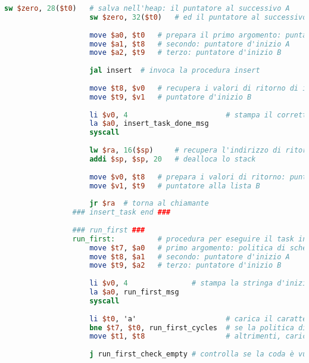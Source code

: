\begin{center}
\begin{lstlisting}[language=mips, gobble=14, stepnumber=1]
                    sw $zero, 28($t0)	# salva nell'heap: il puntatore al successivo A
                    sw $zero, 32($t0)	# ed il puntatore al successivo B
                    
                    move $a0, $t0	# prepara il primo argomento: puntatore al task appena creato (da inserire)
                    move $a1, $t8	# secondo: puntatore d'inizio A
                    move $a2, $t9	# terzo: puntatore d'inizio B
                    
                    jal insert	# invoca la procedura insert
                    
                    move $t8, $v0	# recupera i valori di ritorno di insert: puntatore d'inizio A
                    move $t9, $v1	# puntatore d'inizio B
                
                    li $v0, 4						# stampa il corretto inserimento del task
                    la $a0, insert_task_done_msg
                    syscall
                    
                    lw $ra, 16($sp)		# recupera l'indirizzo di ritorno al chiamante
                    addi $sp, $sp, 20	# dealloca lo stack
                    
                    move $v0, $t8	# prepara i valori di ritorno: puntatore alla lista A
                    move $v1, $t9	# puntatore alla lista B
                    
                    jr $ra	# torna al chiamante
                ### insert_task end ###
                
                ### run_first ###
                run_first:			# procedura per eseguire il task in testa alla coda
                    move $t7, $a0	# primo argomento: politica di scheduling
                    move $t8, $a1	# secondo: puntatore d'inizio A
                    move $t9, $a2	# terzo: puntatore d'inizio B
                
                    li $v0, 4               # stampa la stringa d'inizio dell'esecuzione del primo task
                    la $a0, run_first_msg
                    syscall
                    
                    li $t0, 'a'						# carica il carattere 'a'
                    bne $t7, $t0, run_first_cycles	# se la politica di scheduling non è A,  passa all'inizializzazione per la politica B
                    move $t1, $t8					# altrimenti, carica il puntatore d'inizio di A
                    
                    j run_first_check_empty	# controlla se la coda è vuota
                    

\end{lstlisting}
\end{center}
